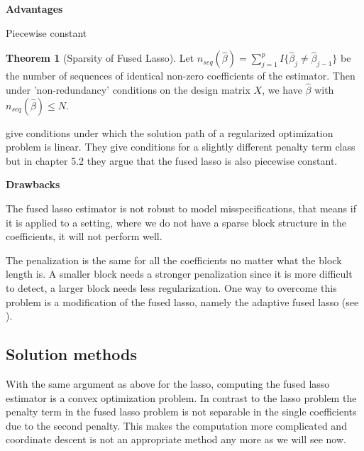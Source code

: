\documentclass{article}
\theoremstyle{definition}
\newtheorem{theorem}{Theorem}
\begin{document}

\noindent\textbf{Advantages} \newline

\noindent Piecewise constant
\begin{theorem}[Sparsity of Fused Lasso] \citep{fused}
	Let $n_{seq}(\hat{\beta}) = \sum_{j=1}^{p} I \{\hat{\beta}_j \neq \hat{\beta}_{j-1}\}$ be the number of sequences of identical non-zero coefficients of the estimator. Then under 'non-redundancy' conditions on the design matrix $X$, we have $\hat{\beta}$ with $n_{seq}(\hat{\beta}) \leq N$.
\end{theorem}

\citet{rosset2007piecewise} give conditions under which the solution path of a regularized optimization problem is linear. They give conditions for a slightly different penalty term class but in chapter 5.2 they argue that the fused lasso is also piecewise constant.
\bigskip

\noindent\textbf{Drawbacks} \newline

The fused lasso estimator is not robust to model misspecifications, that means if it is applied to a setting, where we do not have a sparse block structure in the coefficients, it will not perform well.

The penalization is the same for all the coefficients no matter what the block length is. A smaller block needs a stronger penalization since it is more difficult to detect, a larger block needs less regularization. One way to overcome this problem is a modification of the fused lasso, namely the adaptive fused lasso (see \citep{rinaldoproperties}).


\subsection{Solution methods}

With the same argument as above for the lasso, computing the fused lasso estimator is a convex optimization problem. In contrast to the lasso problem the penalty term in the fused lasso problem is not separable in the single coefficients due to the second penalty. This makes the computation more complicated and coordinate descent is not an appropriate method any more as we will see now.
\end{document}
